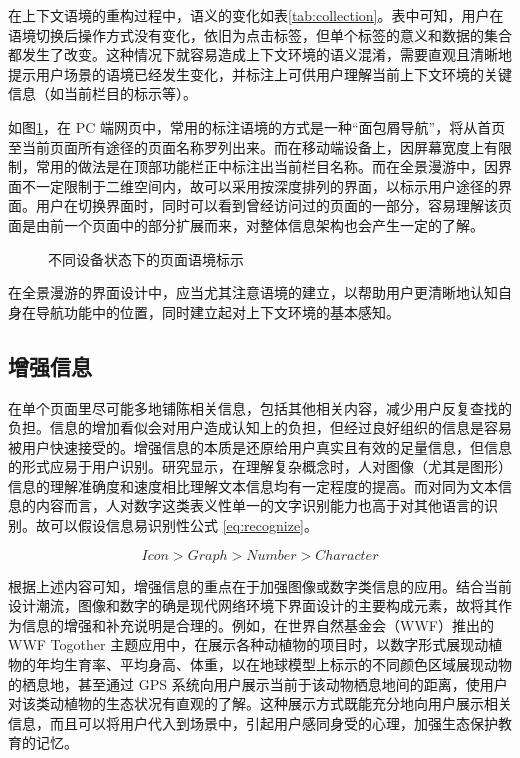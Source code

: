 在上下文语境的重构过程中，语义的变化如表\ref{tab:collection}。表中可知，用户在语境切换后操作方式没有变化，依旧为点击标签，但单个标签的意义和数据的集合都发生了改变。这种情况下就容易造成上下文环境的语义混淆，需要直观且清晰地提示用户场景的语境已经发生变化，并标注上可供用户理解当前上下文环境的关键信息（如当前栏目的标示等）。

如图\ref{fig:tab}，在 PC 端网页中，常用的标注语境的方式是一种“面包屑导航”，将从首页至当前页面所有途径的页面名称罗列出来。而在移动端设备上，因屏幕宽度上有限制，常用的做法是在顶部功能栏正中标注出当前栏目名称。而在全景漫游中，因界面不一定限制于二维空间内，故可以采用按深度排列的界面，以标示用户途径的界面。用户在切换界面时，同时可以看到曾经访问过的页面的一部分，容易理解该页面是由前一个页面中的部分扩展而来，对整体信息架构也会产生一定的了解。

\begin{figure}[htp]
\centering
{}
\caption{不同设备状态下的页面语境标示}
\label{fig:tab}
\end{figure}

在全景漫游的界面设计中，应当尤其注意语境的建立，以帮助用户更清晰地认知自身在导航功能中的位置，同时建立起对上下文环境的基本感知。

\subsection{增强信息}
在单个页面里尽可能多地铺陈相关信息，包括其他相关内容，减少用户反复查找的负担。信息的增加看似会对用户造成认知上的负担，但经过良好组织的信息是容易被用户快速接受的。增强信息的本质是还原给用户真实且有效的足量信息，但信息的形式应易于用户识别。研究显示，在理解复杂概念时，人对图像（尤其是图形）信息的理解准确度和速度相比理解文本信息均有一定程度的提高。而对同为文本信息的内容而言，人对数字这类表义性单一的文字识别能力也高于对其他语言的识别。故可以假设信息易识别性公式 \ref{eq:recognize}。

\begin{equation}
Icon > Graph > Number > Character 
\label{eq:recognize}
\end{equation}

根据上述内容可知，增强信息的重点在于加强图像或数字类信息的应用。结合当前设计潮流，图像和数字的确是现代网络环境下界面设计的主要构成元素，故将其作为信息的增强和补充说明是合理的。例如，在世界自然基金会（WWF）推出的 WWF Togother 主题应用中，在展示各种动植物的项目时，以数字形式展现动植物的年均生育率、平均身高、体重，以在地球模型上标示的不同颜色区域展现动物的栖息地，甚至通过 GPS 系统向用户展示当前于该动物栖息地间的距离，使用户对该类动植物的生态状况有直观的了解。这种展示方式既能充分地向用户展示相关信息，而且可以将用户代入到场景中，引起用户感同身受的心理，加强生态保护教育的记忆。

